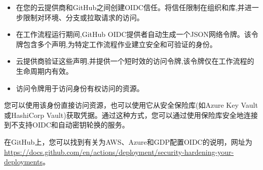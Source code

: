 \begin{itemize}
\item 
在您的云提供商和GitHub之间创建OIDC信任。将信任限制在组织和库,并进一步限制对环境、分支或拉取请求的访问。

\item 
在工作流程运行期间,GitHub OIDC提供者自动生成一个JSON网络令牌。该令牌包含多个声明,为特定工作流程作业建立安全和可验证的身份。

\item 
云提供商验证这些声明,并提供一个短时效的访问令牌,该令牌仅在工作流程的生命周期内有效。

\item 
访问令牌用于访问身份有权访问的资源。
\end{itemize}

您可以使用该身份直接访问资源，也可以使用它从安全保险库(如Azure Key Vault或HashiCorp Vault)获取凭据。通过这种方式，您可以通过使用保险库安全地连接到不支持OIDC和自动密钥轮换的服务。

在GitHub上，您可以找到有关为AWS、Azure和GDP配置OIDC的说明，网址为\url{https://docs.github.com/en/actions/deployment/security-hardening-your-deployments}。
